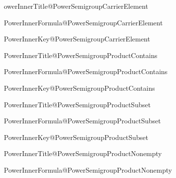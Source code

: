 \expandafter\newcommand\csname PowerInnerTitle@PowerSemigroupCarrierElement

\expandafter\newcommand\csname PowerInnerFormula@PowerSemigroupCarrierElement

\expandafter\newcommand\csname PowerInnerKey@PowerSemigroupCarrierElement

\expandafter\newcommand\csname PowerInnerTitle@PowerSemigroupProductContains

\expandafter\newcommand\csname PowerInnerFormula@PowerSemigroupProductContains

\expandafter\newcommand\csname PowerInnerKey@PowerSemigroupProductContains

\expandafter\newcommand\csname PowerInnerTitle@PowerSemigroupProductSubset

\expandafter\newcommand\csname PowerInnerFormula@PowerSemigroupProductSubset

\expandafter\newcommand\csname PowerInnerKey@PowerSemigroupProductSubset

\expandafter\newcommand\csname PowerInnerTitle@PowerSemigroupProductNonempty

\expandafter\newcommand\csname PowerInnerFormula@PowerSemigroupProductNonempty


